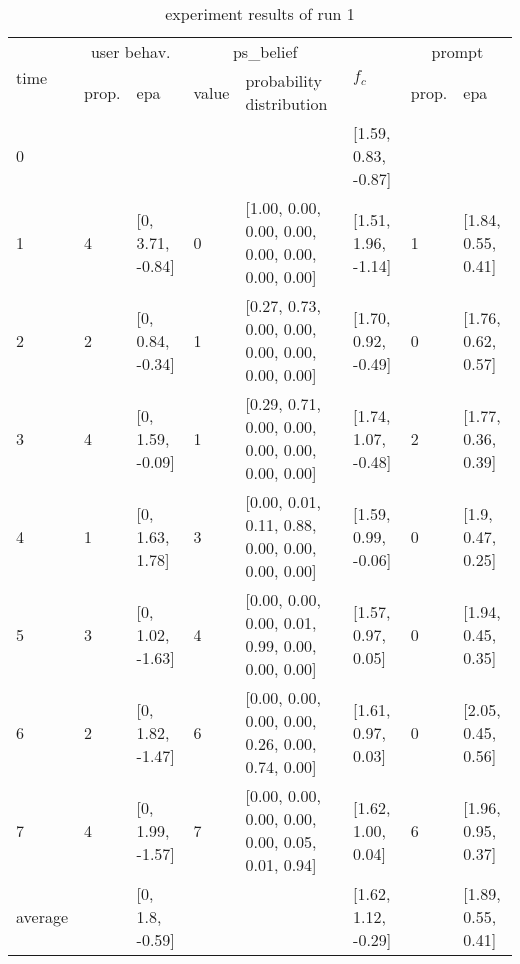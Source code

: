 \begin{table}[htbp]\footnotesize
\caption{experiment results of run 1}
\begin{center}
\begin{tabular}{|p{0.4cm}|p{0.6cm}|l|p{0.6cm}|p{3.3cm}|l|p{0.6cm}|l|}
\hline

\multirow{2}{*}{time} & \multicolumn{2}{c|}{user behav.} & \multicolumn{2}{c|}{ps\_belief} &
\multirow{2}{*}{$f_c$} & \multicolumn{2}{c|}{prompt} \\ \cline{2-5}\cline{ 7- 8}
& prop. & epa & value & probability distribution &  & prop. & epa \\ \hline

0 & \multicolumn{ 1}{l|}{} &  & \multicolumn{1}{l|}{} &  & [1.59, 0.83, -0.87] & \multicolumn{ 1}{l|}{} &  \\ \hline
1 & 4 & [0, 3.71, -0.84] & 0 & [1.00, 0.00, 0.00, 0.00, 0.00, 0.00, 0.00, 0.00] & [1.51, 1.96, -1.14] & 1 & [1.84, 0.55, 0.41] \\ \hline
2 & 2 & [0, 0.84, -0.34] & 1 & [0.27, 0.73, 0.00, 0.00, 0.00, 0.00, 0.00, 0.00] & [1.70, 0.92, -0.49] & 0 & [1.76, 0.62, 0.57] \\ \hline
3 & 4 & [0, 1.59, -0.09] & 1 & [0.29, 0.71, 0.00, 0.00, 0.00, 0.00, 0.00, 0.00] & [1.74, 1.07, -0.48] & 2 & [1.77, 0.36, 0.39] \\ \hline
4 & 1 & [0, 1.63, 1.78] & 3 & [0.00, 0.01, 0.11, 0.88, 0.00, 0.00, 0.00, 0.00] & [1.59, 0.99, -0.06] & 0 & [1.9, 0.47, 0.25] \\ \hline
5 & 3 & [0, 1.02, -1.63] & 4 & [0.00, 0.00, 0.00, 0.01, 0.99, 0.00, 0.00, 0.00] & [1.57, 0.97, 0.05] & 0 & [1.94, 0.45, 0.35] \\ \hline
6 & 2 & [0, 1.82, -1.47] & 6 & [0.00, 0.00, 0.00, 0.00, 0.26, 0.00, 0.74, 0.00] & [1.61, 0.97, 0.03] & 0 & [2.05, 0.45, 0.56] \\ \hline
7 & 4 & [0, 1.99, -1.57] & 7 & [0.00, 0.00, 0.00, 0.00, 0.00, 0.05, 0.01, 0.94] & [1.62, 1.00, 0.04] & 6 & [1.96, 0.95, 0.37] \\ \hline
\multicolumn{1}{|l|}{average} & \multicolumn{1}{l|}{} & [0, 1.8, -0.59] & \multicolumn{1}{l|}{} &  & [1.62, 1.12, -0.29] & \multicolumn{1}{l|}{} & [1.89, 0.55, 0.41] \\ \hline
\end{tabular}
\end{center}
\label{}
\end{table}


